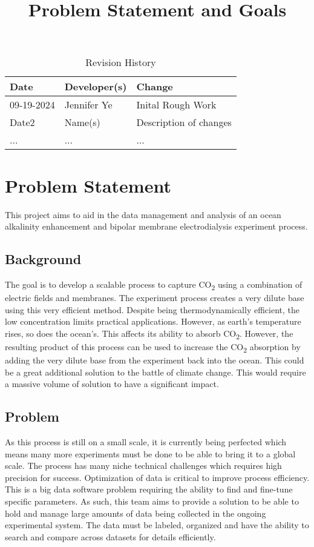 \documentclass{article}
\title{Problem Statement and Goals\\\progname}
\author{\authname}
\date{}
\begin{document}
\maketitle

\begin{table}[hp]
\caption{Revision History} \label{TblRevisionHistory}
\begin{tabularx}{\textwidth}{llX}
\toprule
\textbf{Date} & \textbf{Developer(s)} & \textbf{Change}\\
\midrule
09-19-2024 & Jennifer Ye & Inital Rough Work \\
Date2 & Name(s) & Description of changes\\
... & ... & ...\\
\bottomrule
\end{tabularx}
\end{table}


\section{Problem Statement}
This project aims to aid in the data management and analysis of an ocean
alkalinity enhancement and bipolar membrane electrodialysis experiment process.


\subsection{Background}
The goal is to develop a scalable process to capture CO\textsubscript{2} using a
combination of electric fields and membranes. The experiment process creates a
very dilute base using this very efficient method. Despite being
thermodynamically efficient, the low concentration limits practical
applications. However, as earth's temperature rises, so does the ocean's. This
affects its ability to absorb CO\textsubscript{2}. However, the resulting
product of this process can be used to increase the CO\textsubscript{2}
absorption by adding the very dilute base from the experiment back into the
ocean. This could be a great additional solution to the battle of climate
change. This would require a massive volume of solution to have a significant
impact.

\subsection{Problem}
As this process is still on a small scale, it is currently being perfected which
means many more experiments must be done to be able to bring it to a global
scale. The process has many niche technical challenges which requires high
precision for success. Optimization of data is critical to improve process
efficiency. This is a big data software problem requiring the ability to find
and fine-tune specific parameters.
\newline
As such, this team aims to provide a solution to be able to hold and manage
large amounts of data being collected in the ongoing experimental system. The
data must be labeled, organized and have the ability to search and compare
across datasets for details efficiently.
\newline
\end{document}
